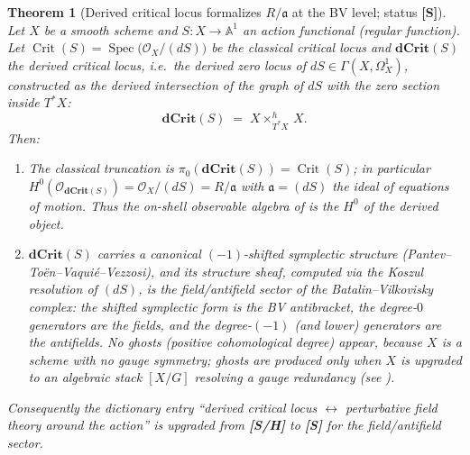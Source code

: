 \documentclass[12pt]{article}
\newtheorem{theorem}{Theorem}[section]
\theoremstyle{definition}
\theoremstyle{remark}
\newcommand{\Spec}{\operatorname{Spec}}
\newcommand{\Ideal}{\mathfrak{a}}
\newcommand{\Crit}{\operatorname{Crit}}
\newcommand{\dCrit}{\mathbf{dCrit}}
\newcommand{\AAf}{\mathbb{A}}
\newcommand{\Ohm}{\mathcal{O}}
\newcommand{\status}[1]{\textnormal{\textsf{\textbf{[#1]}}}}
\begin{document}
\begin{theorem}[Derived critical locus formalizes $R/\Ideal$ at the BV level; status \status{S}]
\label{thm:dcrit}
Let $X$ be a smooth scheme and $S\colon X\to\AAf^1$ an action functional (regular function). Let
$\Crit(S)=\Spec\bigl(\Ohm_X/(dS)\bigr)$ be the classical critical locus and $\dCrit(S)$ the
\emph{derived} critical locus, i.e.\ the derived zero locus of $dS\in\Gamma(X,\Omega^1_X)$, constructed
as the derived intersection of the graph of $dS$ with the zero section inside $T^\ast X$:
\[
  \dCrit(S) \;=\; X \times^{h}_{T^\ast X}\, X.
\]
Then:
\begin{enumerate}
  \item The classical truncation is $\pi_0(\dCrit(S)) = \Crit(S)$; in particular
  $H^0(\Ohm_{\dCrit(S)}) = \Ohm_X/(dS) = R/\Ideal$ with $\Ideal=(dS)$ the ideal of equations of motion.
  Thus the on-shell observable algebra of  is the $H^0$ of the derived object.
  \item $\dCrit(S)$ carries a canonical $(-1)$-shifted symplectic structure (Pantev--To\"en--Vaqui\'e--Vezzosi),
  and its structure sheaf, computed via the Koszul resolution of $(dS)$, is the field/antifield sector of
  the Batalin--Vilkovisky complex: the shifted symplectic form is the BV antibracket, the degree-$0$
  generators are the fields, and the degree-$(-1)$ (and lower) generators are the antifields. No ghosts
  (positive cohomological degree) appear, because $X$ is a scheme with no gauge symmetry; ghosts are
  produced only when $X$ is upgraded to an algebraic \emph{stack} $[X/G]$ resolving a gauge redundancy
  (see ).
\end{enumerate}
Consequently the dictionary entry ``derived critical locus $\leftrightarrow$ perturbative field theory
around the action'' is upgraded from \status{S/H} to \status{S} for the field/antifield sector.
\end{theorem}
\end{document}
